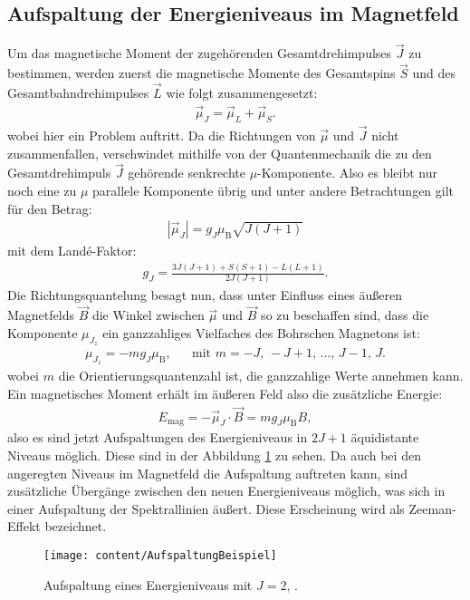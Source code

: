 \subsection{Aufspaltung der Energieniveaus im Magnetfeld}
Um das magnetische Moment der zugehörenden Gesamtdrehimpulses $\vec{J}$ zu bestimmen, werden zuerst die magnetische Momente des Gesamtspins $\vec{S} $ und des Gesamtbahndrehimpulses $\vec{L}$ wie folgt zusammengesetzt:
\begin{align}
\vec{\mu}_J=\vec{\mu}_L+\vec{\mu}_S.
\end{align} 
wobei hier ein Problem auftritt. Da die Richtungen von $\vec{\mu}$ und $\vec{J}$ nicht zusammenfallen, verschwindet mithilfe von der Quantenmechanik die zu den Gesamtdrehimpuls $\vec{J}$ gehörende senkrechte $\mu$-Komponente. Also es bleibt nur noch eine zu $\mu$ parallele Komponente übrig und unter andere Betrachtungen gilt für den Betrag:
\begin{align}
|\vec{\mu}_J|=g_J\mu_\text{B}\sqrt{J(J+1)}
\end{align}
mit dem Landé-Faktor:
\begin{align}
g_J=\frac{3J(J+1)+S(S+1)-L(L+1)}{2J(J+1)}. \label{eqn:lande}
\end{align}
Die Richtungsquantelung besagt nun, dass unter Einfluss eines äußeren Magnetfelds $\vec{B}$ die Winkel zwischen $\vec{\mu}$ und $\vec{B}$ so zu beschaffen sind, dass die Komponente $\mu_{J_z}$ ein ganzzahliges Vielfaches des Bohrschen Magnetons ist:
\begin{align}
\mu_{J_z}=-mg_J\mu_\text{B}, &&\text{mit } m=-J,\,-J+1,\,...,\,J-1,\,J.
\end{align}
wobei $m$ die Orientierungsquantenzahl ist, die ganzzahlige Werte annehmen kann. Ein magnetisches Moment erhält im äußeren Feld also die zusätzliche Energie: 
\begin{align}
E_\text{mag}=-\vec{\mu}_J\cdot\vec{B}=mg_J\mu_\text{B}B,
\label{eqn:emag}
\end{align}
also es sind jetzt Aufspaltungen des Energieniveaus in $2J+1$ äquidistante Niveaus möglich. Diese sind in der Abbildung \ref{fig:aufspaltungbeispiel} zu sehen. Da auch bei den angeregten Niveaus im Magnetfeld die Aufspaltung auftreten kann, sind zusätzliche Übergänge zwischen den neuen Energieniveaus möglich, was sich in einer Aufspaltung der Spektrallinien äußert. Diese Erscheinung wird als Zeeman-Effekt bezeichnet.
\begin{figure}[h!]
	\centering
	\texttt{[image: content/AufspaltungBeispiel]}
	\caption{Aufspaltung eines Energieniveaus mit $J = 2$, \cite[5]{anleitungV27}.}
	\label{fig:aufspaltungbeispiel}
\end{figure}

